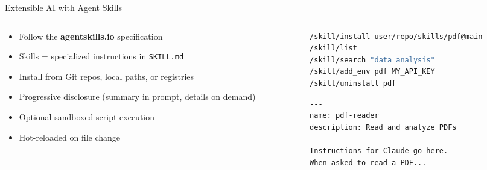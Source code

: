 \documentclass[aspectratio=169,10pt]{beamer}
\begin{document}
\begin{frame}[fragile]{Extensible AI with Agent Skills}
\begin{columns}[T]
\begin{column}{0.48\textwidth}
\begin{itemize}
  \item Follow the \textbf{agentskills.io} specification
  \item Skills = specialized instructions in \texttt{SKILL.md}
  \item Install from Git repos, local paths, or registries
  \item Progressive disclosure (summary in prompt, details on demand)
  \item Optional sandboxed script execution
  \item Hot-reloaded on file change
\end{itemize}
\end{column}
\begin{column}{0.48\textwidth}
\begin{lstlisting}[style=code,language=bash,basicstyle=\ttfamily\tiny,title={\scriptsize Skill Management}]
/skill/install user/repo/skills/pdf@main
/skill/list
/skill/search "data analysis"
/skill/add_env pdf MY_API_KEY
/skill/uninstall pdf
\end{lstlisting}

\smallskip
\begin{lstlisting}[style=code,basicstyle=\ttfamily\tiny,title={\scriptsize SKILL.md structure}]
---
name: pdf-reader
description: Read and analyze PDFs
---
Instructions for Claude go here.
When asked to read a PDF...
\end{lstlisting}
\end{column}
\end{columns}
\end{frame}
\end{document}
